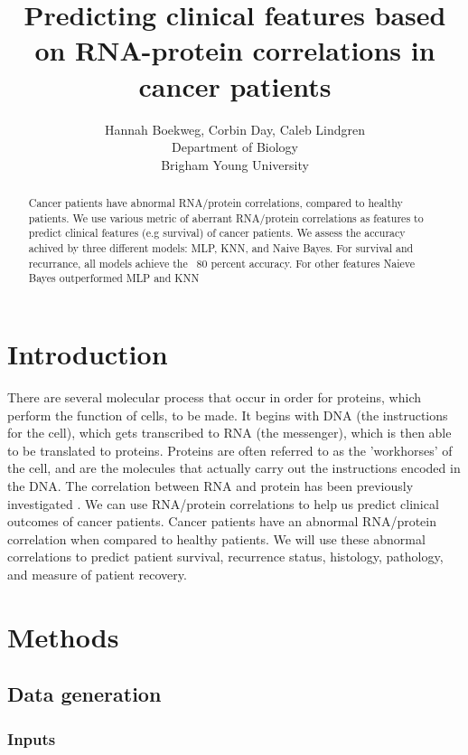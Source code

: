 \documentclass{article}
\title{Predicting clinical features based on RNA-protein correlations in cancer patients}
\author{Hannah Boekweg, Corbin Day, Caleb Lindgren \\
Department of Biology\\
Brigham Young University}
\begin{document}
\maketitle

\begin{abstract}
  Cancer patients have abnormal RNA/protein correlations, compared to healthy patients.
  We use various metric of aberrant RNA/protein correlations as features to predict clinical features (e.g survival) of cancer patients.
  We assess the accuracy achived by three different models: MLP, KNN, and Naive Bayes. For survival and recurrance, all models achieve the ~80 percent accuracy. For other features Naieve Bayes outperformed MLP and KNN

\end{abstract}

\section{Introduction}
There are several molecular process that occur in order for proteins, which perform the function of cells, to be made. 
It begins with DNA (the instructions for the cell), which gets transcribed to RNA (the messenger), which is then able to be translated to proteins. 
Proteins are often referred to as the 'workhorses' of the cell, and are the molecules that actually carry out the instructions encoded in the DNA.
The correlation between RNA and protein has been previously investigated \cite{waldbauer_transcriptome_2012} \cite{payne_utility_2015} \cite{han_transcriptome_2021}.
We can use RNA/protein correlations to help us predict clinical outcomes of cancer patients. Cancer patients have an abnormal RNA/protein correlation when compared to healthy patients. 
We will use these abnormal correlations to predict patient survival, recurrence status, histology, pathology, and measure of patient recovery. 

\section{Methods}

\subsection{Data generation}

\subsubsection{Inputs}
\end{document}
